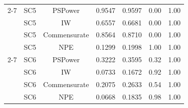 \begin{longtable}{llccccc}
\cmidrule(lr){2-7}
& SC5 & PSPower      & 0.9547 & 0.9597 & 0.00 & 1.00 \\
& SC5 & IW           & 0.6557 & 0.6681 & 0.00 & 1.00 \\
& SC5 & Commensurate & 0.8564 & 0.8710 & 0.00 & 1.00 \\
& SC5 & NPE          & 0.1299 & 0.1998 & 1.00 & 1.00 \\
\cmidrule(lr){2-7}
& SC6 & PSPower      & 0.3222 & 0.3595 & 0.32 & 1.00 \\
& SC6 & IW           & 0.0733 & 0.1672 & 0.92 & 1.00 \\
& SC6 & Commensurate & 0.2075 & 0.2633 & 0.54 & 1.00 \\
& SC6 & NPE          & 0.0668 & 0.1835 & 0.98 & 1.00 \\
\bottomrule
\end{longtable}
\normalsize

